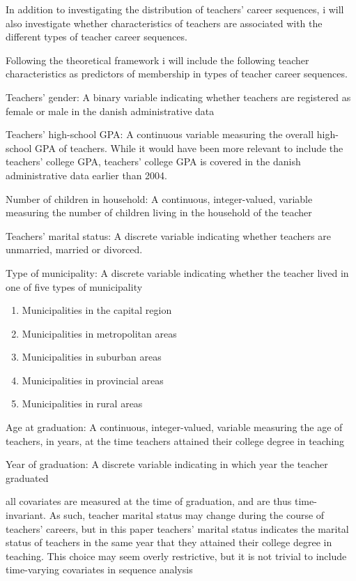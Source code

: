 \documentclass[
]{article}
\begin{document}
In addition to investigating the distribution of teachers' career sequences, i will also investigate whether characteristics of teachers are associated with the different types of teacher career sequences.

Following the theoretical framework i will include the following teacher characteristics as predictors of membership in types of teacher career sequences.

Teachers' gender: A binary variable indicating whether teachers are registered as female or male in the danish administrative data

Teachers' high-school GPA: A continuous variable measuring the overall high-school GPA of teachers. While it would have been more relevant to include the teachers' college GPA, teachers' college GPA is covered in the danish administrative data earlier than 2004.

Number of children in household: A continuous, integer-valued, variable measuring the number of children living in the household of the teacher

Teachers' marital status: A discrete variable indicating whether teachers are unmarried, married or divorced.

Type of municipality: A discrete variable indicating whether the teacher lived in one of five types of municipality

\begin{enumerate}
\def\labelenumi{\arabic{enumi})}
\item
  Municipalities in the capital region
\item
  Municipalities in metropolitan areas
\item
  Municipalities in suburban areas
\item
  Municipalities in provincial areas
\item
  Municipalities in rural areas
\end{enumerate}

Age at graduation: A continuous, integer-valued, variable measuring the age of teachers, in years, at the time teachers attained their college degree in teaching

Year of graduation: A discrete variable indicating in which year the teacher graduated

all covariates are measured at the time of graduation, and are thus time-invariant. As such, teacher marital status may change during the course of teachers' careers, but in this paper teachers' marital status indicates the marital status of teachers in the same year that they attained their college degree in teaching. This choice may seem overly restrictive, but it is not trivial to include time-varying covariates in sequence analysis
\end{document}

